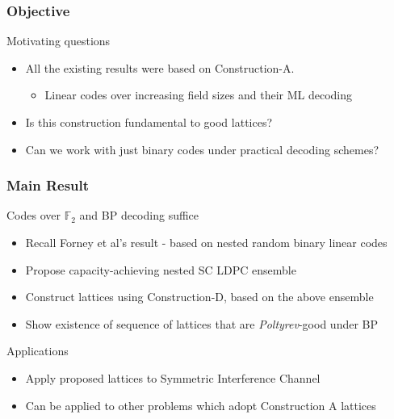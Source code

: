 \documentclass[10pt]{beamer}
\begin{document}
\begin{frame}\frametitle{Objective}
\begin{defn}{Motivating questions}
	\begin{itemize}
		\item All the existing results were based on Construction-A.
		\begin{itemize}
				\item Linear codes over \alert{ increasing field sizes} and their ML decoding 
		\end{itemize}
		\item<2-> Is this construction fundamental to good lattices?
		\item<2-> Can we work with just {\blue binary codes} under {\blue practical decoding} schemes?
	\end{itemize}
\end{defn}
\end{frame}

\begin{frame}\frametitle{Main Result}
			\begin{defn}{Codes over $\mathbb{F}_{2}$ and BP decoding suffice}
				\vspace{1em}
	\begin{itemize}
			\item Recall Forney et al's result - based on nested random binary linear codes
			\item Propose capacity-achieving nested SC LDPC ensemble
			\item Construct lattices using Construction-D, based on the above ensemble
			\item Show existence of sequence of lattices that are \textit{Poltyrev}-good under BP 
	\end{itemize}			
			\end{defn}
\pause
\vspace{2em}
		\begin{block}{Applications}
			    \begin{itemize}
        \item Apply proposed lattices to {\blue Symmetric Interference Channel}
        \item Can be applied to other problems which adopt Construction A lattices
    			\end{itemize}
		\end{block}
\end{frame}
\end{document}
